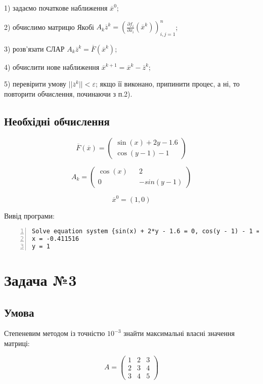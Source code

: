 \documentclass[a4paper, 12pt]{article}
\begin{document}
1) задаємо початкове наближення $\overline{x}^0$;

2) обчислимо матрицю Якобі $A_{k}\overline{z}^k = \left(\frac{\partial f_i}{\partial x_i}(\overline{x}^k)\right)_{i,j=1}^{n}$;

3) розв'язати СЛАР $A_{k}\overline{z}^k = \overline{F}\left(\overline{x}^{k}\right)$;

4) обчислити нове наближення $\overline{x}^{k+1} = \overline{x}^{k} - \overline{z}^{k}$;

5) перевірити умову $||\overline{z}^k|| < \varepsilon$; якщо її виконано, припинити процес, а ні, то повторити обчислення, починаючи з п.2).



\subsection{Необхідні обчислення}

\[
\overline{F}(\overline{x}) = 
\begin{pmatrix}
	\sin(x) + 2y - 1.6 \\
	\cos(y-1) - 1
\end{pmatrix}
\]

\[
A_k = 
\begin{pmatrix}
	\cos(x) && 2 \\
	0 && -sin(y-1)
\end{pmatrix}
\]

\[
\overline{x}^0 = (1, 0)
\]

Вивід програми:

\begin{Verbatim}[numbers=left,xleftmargin=20mm]
Solve equation system {sin(x) + 2*y - 1.6 = 0, cos(y - 1) - 1 = 0}
x = -0.411516
y = 1
\end{Verbatim}

\newpage
\section{Задача №3}

\subsection{Умова}

Степеневим методом із точністю $10^{-3}$ знайти максимальні власні значення матриці:

\[
A = 
\begin{pmatrix}
1 & 2 & 3 \\
2 & 3 & 4 \\
3 & 4 & 5
\end{pmatrix}
\]
\end{document}
